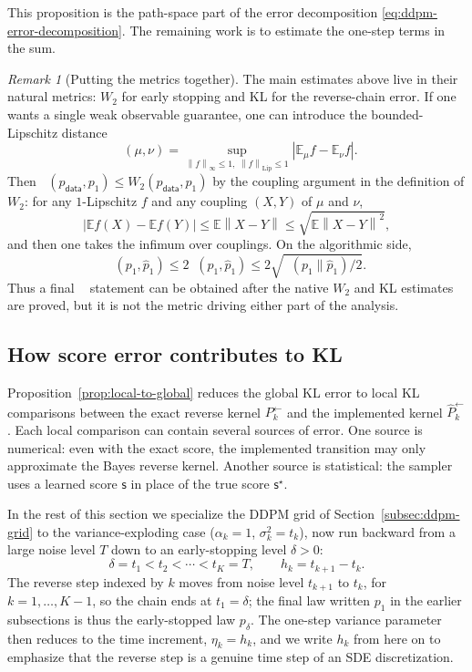 \documentclass{amsart}
\numberwithin{equation}{section}
\theoremstyle{plain}
\theoremstyle{definition}
\theoremstyle{remark}
\newtheorem*{remark}{Remark}
\DeclareMathOperator{\KL}{D_{\mathsf{KL}}}
\DeclareMathOperator{\TV}{D_{\mathsf{TV}}}
\DeclareMathOperator{\BL}{D_{\mathsf{BL}}}
\newcommand{\E}{\mathbb{E}}
\newcommand{\wh}[1]{\widehat{#1}}
\newcommand{\norm}[1]{\left\lVert #1 \right\rVert}
\newcommand{\abs}[1]{\left\lvert #1 \right\rvert}
\newcommand{\pdata}{p_{\mathsf{data}}}
\newcommand{\sstar}{\mathsf{s}^{\star}}
\newcommand{\score}{\mathsf{s}}
\begin{document}
This proposition is the path-space part of the error decomposition
\eqref{eq:ddpm-error-decomposition}.  The remaining work is to estimate
the one-step terms in the sum.

\begin{remark}[Putting the metrics together]\label{rem:combine-metrics}
The main estimates above live in their natural metrics: $W_2$ for early
stopping and KL for the reverse-chain error.  If one wants a single weak
observable guarantee, one can introduce the bounded-Lipschitz distance
\[
    \BL(\mu,\nu)
    =
    \sup_{\norm f_\infty\leq1,\;\norm f_{\mathrm{Lip}}\leq1}
    \abs{\E_\mu f-\E_\nu f}.
\]
Then $\BL(\pdata,p_1)\leq W_2(\pdata,p_1)$ by the coupling argument in the
definition of $W_2$: for any $1$-Lipschitz $f$ and any coupling $(X,Y)$ of
$\mu$ and $\nu$,
\[
    \abs{\E f(X)-\E f(Y)}\leq \E\norm{X-Y}
    \leq \sqrt{\E\norm{X-Y}^2},
\]
and then one takes the infimum over couplings.  On the algorithmic side,
\[
    \BL(p_1,\wh p_1)\leq 2\TV(p_1,\wh p_1)
    \leq 2\sqrt{\KL(p_1\|\wh p_1)/2}.
\]
Thus a final $\BL$ statement can be obtained after the native $W_2$ and KL
estimates are proved, but it is not the metric driving either part of the
analysis.
\end{remark}

\subsection{How score error contributes to KL}

Proposition~\ref{prop:local-to-global} reduces the global KL error to
local KL comparisons between the exact reverse kernel $P_k^{\leftarrow}$ and the
implemented kernel $\wh P_k^{\leftarrow}$.  Each local comparison can contain several
sources of error.  One source is numerical: even with the exact score, the
implemented transition may only approximate the Bayes reverse kernel.  Another
source is statistical: the sampler uses a learned score $\score$ in place of
the true score $\sstar$.

In the rest of this section we specialize the DDPM grid of
Section~\ref{subsec:ddpm-grid} to the variance-exploding case
($\alpha_k=1$, $\sigma_k^2=t_k$), now run backward from a large noise level $T$
down to an early-stopping level $\delta>0$:
\[
    \delta=t_1<t_2<\cdots<t_K=T,\qquad h_k=t_{k+1}-t_k.
\]
The reverse step indexed by $k$ moves from noise level $t_{k+1}$ to $t_k$, for
$k=1,\ldots,K-1$, so the chain ends at $t_1=\delta$; the final law written $p_1$
in the earlier subsections is thus the early-stopped law $p_\delta$.  The one-step variance
parameter then reduces to the time increment, $\eta_k=h_k$, and we write $h_k$
from here on to emphasize that the reverse step is a genuine time step of an SDE
discretization.
\end{document}
